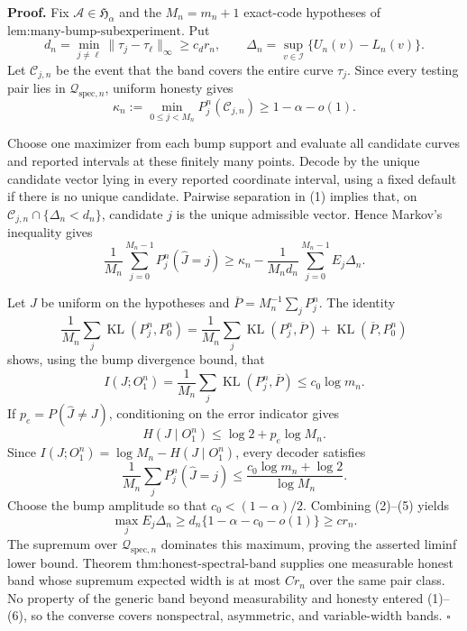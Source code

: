 \textbf{Proof.}
Fix \(\mathcal A\in\mathfrak H_\alpha\) and the \(M_n=m_n+1\) exact-code hypotheses of \(\text{lem:many-bump-subexperiment}\).  Put
\[
 d_n=\min_{j\ne\ell}\|\tau_j-\tau_\ell\|_\infty\ge c_dr_n,
 \qquad
 \Delta_n=\sup_{v\in\mathcal I}\{U_n(v)-L_n(v)\}. \tag{1}
\]
Let \(\mathcal C_{j,n}\) be the event that the band covers the entire curve \(\tau_j\).  Since every testing pair lies in \(\mathcal Q_{\mathrm{spec},n}\), uniform honesty gives
\[
 \kappa_n:=\min_{0\le j<M_n}P_j^n(\mathcal C_{j,n})
 \ge1-\alpha-o(1). \tag{2}
\]

Choose one maximizer from each bump support and evaluate all candidate curves and reported intervals at these finitely many points.  Decode by the unique candidate vector lying in every reported coordinate interval, using a fixed default if there is no unique candidate.  Pairwise separation in (1) implies that, on
\(\mathcal C_{j,n}\cap\{\Delta_n<d_n\}\), candidate \(j\) is the unique admissible vector.  Hence Markov's inequality gives
\[
 \frac1{M_n}\sum_{j=0}^{M_n-1}P_j^n(\widehat J=j)
 \ge\kappa_n-\frac1{M_nd_n}\sum_{j=0}^{M_n-1}E_j\Delta_n. \tag{3}
\]

Let \(J\) be uniform on the hypotheses and \(\overline P=M_n^{-1}\sum_jP_j^n\).  The identity
\[
 \frac1{M_n}\sum_j\operatorname{KL}(P_j^n,P_0^n)
 =\frac1{M_n}\sum_j\operatorname{KL}(P_j^n,\overline P)
 +\operatorname{KL}(\overline P,P_0^n)
\]
shows, using the bump divergence bound, that
\[
 I(J;O_1^n)
 =\frac1{M_n}\sum_j\operatorname{KL}(P_j^n,\overline P)
 \le c_0\log m_n. \tag{4}
\]
If \(p_e=P(\widehat J\ne J)\), conditioning on the error indicator gives
\[
 H(J\mid O_1^n)\le\log2+p_e\log M_n.
\]
Since \(I(J;O_1^n)=\log M_n-H(J\mid O_1^n)\), every decoder satisfies
\[
 \frac1{M_n}\sum_jP_j^n(\widehat J=j)
 \le\frac{c_0\log m_n+\log2}{\log M_n}. \tag{5}
\]
Choose the bump amplitude so that \(c_0<(1-\alpha)/2\).  Combining (2)--(5) yields
\[
 \max_jE_j\Delta_n
 \ge d_n\{1-\alpha-c_0-o(1)\}
 \ge cr_n. \tag{6}
\]
The supremum over \(\mathcal Q_{\mathrm{spec},n}\) dominates this maximum, proving the asserted liminf lower bound.  Theorem \(\text{thm:honest-spectral-band}\) supplies one measurable honest band whose supremum expected width is at most \(Cr_n\) over the same pair class.  No property of the generic band beyond measurability and honesty entered (1)--(6), so the converse covers nonspectral, asymmetric, and variable-width bands. \(\square\)